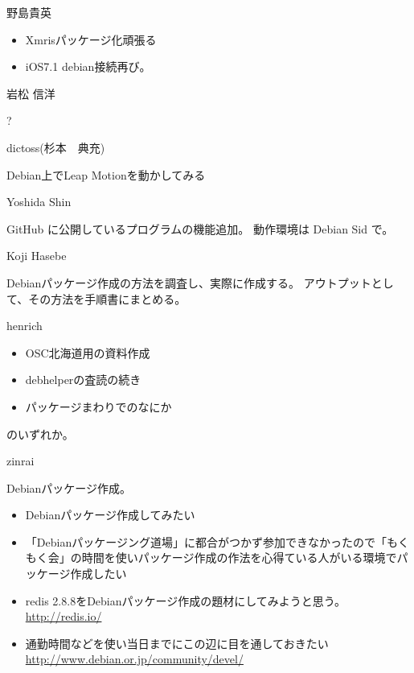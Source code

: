 \begin{prework}{ 野島貴英 }

\begin{itemize}
\item Xmrisパッケージ化頑張る
\item iOS7.1 debian接続再び。
\end{itemize}
\end{prework}

\begin{prework}{ 岩松 信洋 }

?

\end{prework}

\begin{prework}{ dictoss(杉本　典充) }

Debian上でLeap Motionを動かしてみる

\end{prework}

\begin{prework}{ Yoshida Shin }

GitHub に公開しているプログラムの機能追加。
動作環境は Debian Sid で。
\end{prework}

\begin{prework}{ Koji Hasebe }

Debianパッケージ作成の方法を調査し、実際に作成する。
アウトプットとして、その方法を手順書にまとめる。
\end{prework}

\begin{prework}{ henrich }
\begin{itemize}
\item OSC北海道用の資料作成
\item debhelperの査読の続き
\item パッケージまわりでのなにか
\end{itemize}
のいずれか。

\end{prework}

\begin{prework}{ zinrai }

Debianパッケージ作成。
\begin{itemize}
\item Debianパッケージ作成してみたい
\item 「Debianパッケージング道場」に都合がつかず参加できなかったので「もくもく会」の時間を使いパッケージ作成の作法を心得ている人がいる環境でパッケージ作成したい
\item redis 2.8.8をDebianパッケージ作成の題材にしてみようと思う。
\url{http://redis.io/}
\item 通勤時間などを使い当日までにこの辺に目を通しておきたい
\url{http://www.debian.or.jp/community/devel/}
\end{itemize}
\end{prework}

